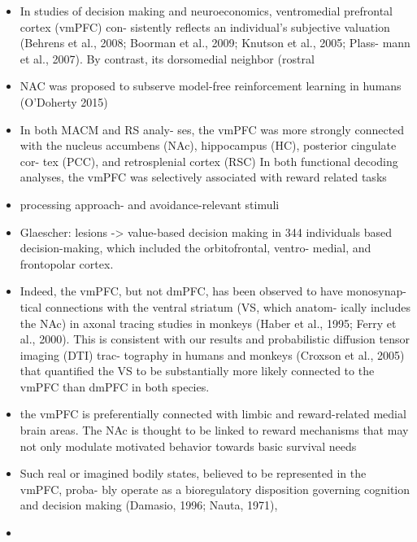 \documentclass{article} %
\begin{document}
\begin{itemize}
\begin{itemize}
\item
In studies of decision making and neuroeconomics, ventromedial prefrontal cortex (vmPFC) con- sistently reflects an individual’s subjective valuation (Behrens et al., 2008; Boorman et al., 2009; Knutson et al., 2005; Plass- mann et al., 2007). By contrast, its dorsomedial neighbor (rostral

\item
NAC was proposed to subserve model-free reinforcement learning in humans
(O'Doherty 2015)

\item
In both MACM and RS analy- ses, the vmPFC was more strongly connected with the nucleus accumbens (NAc), hippocampus (HC), posterior cingulate cor- tex (PCC), and retrosplenial cortex (RSC)
In both functional decoding analyses, the vmPFC was selectively associated with reward related tasks

\item
processing approach- and avoidance-relevant stimuli

\item
Glaescher: lesions -> value-based decision making  in 344 individuals
based decision-making, which included the orbitofrontal, ventro- medial, and frontopolar cortex.

\item
Indeed, the vmPFC, but not dmPFC, has been observed to have monosynap- tical connections with the ventral striatum (VS, which anatom- ically includes the NAc) in axonal tracing studies in monkeys (Haber et al., 1995; Ferry et al., 2000).
This is consistent with our results and probabilistic diffusion tensor imaging (DTI) trac- tography in humans and monkeys (Croxson et al., 2005) that quantified the VS to be substantially more likely connected to the vmPFC than dmPFC in both species.

\item
the vmPFC is preferentially connected with limbic and reward-related medial brain areas.
The NAc is thought to be linked to reward mechanisms that may not only modulate motivated behavior towards basic survival needs

\item
Such real or imagined bodily states, believed to be represented in the vmPFC, proba- bly operate as a bioregulatory disposition governing cognition and decision making (Damasio, 1996; Nauta, 1971),

\item
\end{itemize}




\end{itemize}
\end{document}
